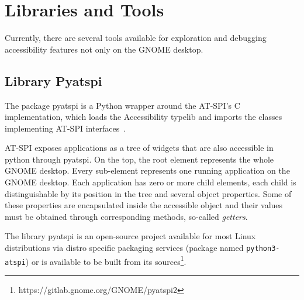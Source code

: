 \section{Libraries and Tools}
Currently, there are several tools available for exploration and debugging accessibility features not only on the GNOME desktop.

\subsection{Library Pyatspi}\label{library_pyatspi}
The package pyatspi is a Python wrapper around the AT-SPI's C implementation, which loads the Accessibility typelib and imports the classes implementing AT-SPI interfaces~\cite{pyatspi}.

AT-SPI exposes applications as a tree of widgets that are also accessible in python through pyatspi. On the top, the root element represents the whole GNOME desktop. Every sub-element represents one running application on the GNOME desktop. Each application has zero or more child elements, each child is distinguishable by its position in the tree and several object properties. Some of these properties are encapsulated inside the accessible object and their values must be obtained through corresponding methods, so-called \textit{getters}. 

The library pyatspi is an open-source project available for most Linux distributions via distro specific packaging services (package named \texttt{python3-atspi}) or is available to be built from its sources\footnote{https://gitlab.gnome.org/GNOME/pyatspi2}.


